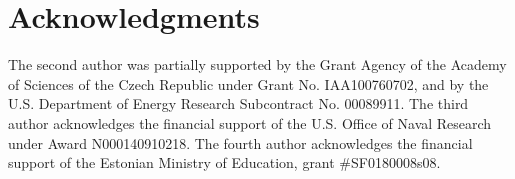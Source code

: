 \documentclass[mathpazo]{cicp}
\begin{document}


\maketitle









\section*{Acknowledgments}
The second author was partially supported by the Grant Agency of the Academy of 
Sciences of the Czech Republic under Grant No. IAA100760702, and by the U.S.
Department of Energy Research Subcontract No. 00089911. 
The third author acknowledges the financial support of the U.S. Office of Naval Research 
under Award N000140910218. The fourth author acknowledges the financial support of
the Estonian Ministry of Education, grant \#SF0180008s08.



\end{document}
